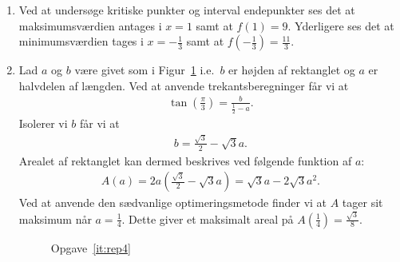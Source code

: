 \begin{enumerate}
	
	
	\item Ved at undersøge kritiske punkter og interval endepunkter ses det at maksimumsværdien antages i $x=1$ samt at $f(1)=9$. Yderligere ses det at minimumsværdien tages i $x=-\frac{1}{3}$ samt at $f(-\frac{1}{3})=\frac{11}{3}$.
	
	\item\label{it:rep4} Lad $a$ og $b$ være givet som i Figur~\ref{fig:rep4} i.e.\ $b$ er højden af rektanglet og $a$ er halvdelen af længden. Ved at anvende trekantsberegninger får vi at
	\begin{align*}
	\tan(\frac{\pi}{3})=\frac{b}{\frac{1}{2}-a}.
	\end{align*}
	Isolerer vi $b$ får vi at
	\begin{align*}
	b=\frac{\sqrt{3}}{2}-\sqrt{3}a.
	\end{align*}
	Arealet af rektanglet kan dermed beskrives ved følgende funktion af $a$:
	\begin{align*}
	A(a)=2a(\frac{\sqrt{3}}{2}-\sqrt{3}a)=\sqrt{3}a-2\sqrt{3}a^2.
	\end{align*}
	Ved at anvende den sædvanlige optimeringsmetode finder vi at $A$ tager sit maksimum når $a=\frac{1}{4}$. Dette giver et maksimalt areal på $A(\frac{1}{4})=\frac{\sqrt{3}}{8}$. 
	
	
	
		\begin{figure}
			\centering
			\caption{Opgave~\ref{it:rep4}}
			\label{fig:rep4}
		\end{figure}
	
	
	

\end{enumerate}
